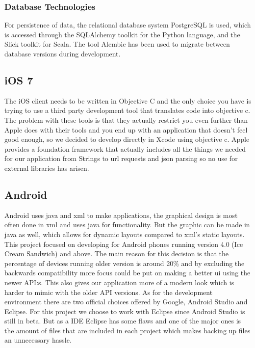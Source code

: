 \subsubsection{Database Technologies}
For persistence of data, the relational database system PostgreSQL\cite{ref_postgres} is used, which is accessed through the SQLAlchemy\cite{ref_sqlalchemy} toolkit for the Python language, and the Slick\cite{ref_slick} toolkit for Scala. The tool Alembic\cite{ref_alembic} has been used to migrate between database versions during development.

\subsection{iOS 7}
The iOS client needs to be written in Objective C and the only choice you have is trying to use a third party development tool that translates code into objective c. The problem with these tools is that they actually restrict you even further than Apple does with their tools and you end up with an application that doesn't feel good enough, so we decided to develop directly in Xcode using objective c. Apple provides a foundation framework that actually includes all the things we needed for our application from Strings to url requests and json parsing so no use for external libraries has arisen. 

\subsection{Android}
Android uses java and xml to make applications, the graphical design is most often done in xml and uses java for functionality. But the graphic can be made in java as well, which allows for dynamic layouts compared to xml's static layouts. 
This project focused on developing for Android phones running version 4.0 (Ice Cream Sandwich) and above. The main reason for this decision is that the percentage of devices running older version is around 20\%\cite{ref_android_versions} and by excluding the backwards compatibility more focus could be put on making a better ui using the newer API:s. This also gives our application more of a modern look which is harder to mimic with the older API versions.
As for the development environment there are two official choices offered by Google, Android Studio and Eclipse. For this project we choose to work with Eclipse since Android Studio is still in beta. But as a IDE Eclipse has some flaws and one of the major ones is the amount of files that are included in each project which makes backing up files an unnecessary hassle.

